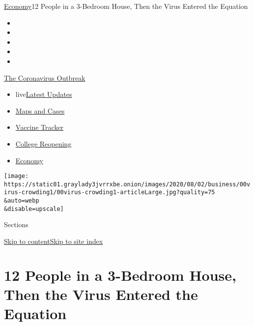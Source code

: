 \href{/section/business/economy}{Economy}\textbar{}12 People in a
3-Bedroom House, Then the Virus Entered the Equation

\begin{itemize}
\item
\item
\item
\item
\item
\end{itemize}

\href{https://www.nytimes3xbfgragh.onion/news-event/coronavirus?action=click\&pgtype=Article\&state=default\&region=TOP_BANNER\&context=storylines_menu}{The
Coronavirus Outbreak}

\begin{itemize}
\tightlist
\item
  live\href{https://www.nytimes3xbfgragh.onion/2020/08/03/world/coronavirus-covid-19.html?action=click\&pgtype=Article\&state=default\&region=TOP_BANNER\&context=storylines_menu}{Latest
  Updates}
\item
  \href{https://www.nytimes3xbfgragh.onion/interactive/2020/us/coronavirus-us-cases.html?action=click\&pgtype=Article\&state=default\&region=TOP_BANNER\&context=storylines_menu}{Maps
  and Cases}
\item
  \href{https://www.nytimes3xbfgragh.onion/interactive/2020/science/coronavirus-vaccine-tracker.html?action=click\&pgtype=Article\&state=default\&region=TOP_BANNER\&context=storylines_menu}{Vaccine
  Tracker}
\item
  \href{https://www.nytimes3xbfgragh.onion/2020/08/02/us/covid-college-reopening.html?action=click\&pgtype=Article\&state=default\&region=TOP_BANNER\&context=storylines_menu}{College
  Reopening}
\item
  \href{https://www.nytimes3xbfgragh.onion/live/2020/08/03/business/stock-market-today-coronavirus?action=click\&pgtype=Article\&state=default\&region=TOP_BANNER\&context=storylines_menu}{Economy}
\end{itemize}

\texttt{[image: https://static01.graylady3jvrrxbe.onion/images/2020/08/02/business/00virus-crowding1/00virus-crowding1-articleLarge.jpg?quality=75\\\&auto=webp\\\&disable=upscale]}

Sections

\protect\hyperlink{site-content}{Skip to
content}\protect\hyperlink{site-index}{Skip to site index}

\hypertarget{12-people-in-a-3-bedroom-house-then-the-virus-entered-the-equation}{%
\section{12 People in a 3-Bedroom House, Then the Virus Entered the
Equation}\label{12-people-in-a-3-bedroom-house-then-the-virus-entered-the-equation}}

